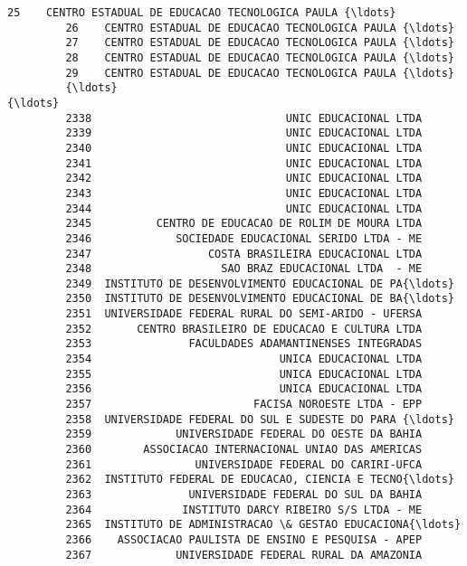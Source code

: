 \documentclass[11pt]{article}
\begin{document}
\begin{Verbatim}[commandchars=\\\{\}]
         25    CENTRO ESTADUAL DE EDUCACAO TECNOLOGICA PAULA {\ldots}   
         26    CENTRO ESTADUAL DE EDUCACAO TECNOLOGICA PAULA {\ldots}   
         27    CENTRO ESTADUAL DE EDUCACAO TECNOLOGICA PAULA {\ldots}   
         28    CENTRO ESTADUAL DE EDUCACAO TECNOLOGICA PAULA {\ldots}   
         29    CENTRO ESTADUAL DE EDUCACAO TECNOLOGICA PAULA {\ldots}   
         {\ldots}                                                 {\ldots}   
         2338                              UNIC EDUCACIONAL LTDA   
         2339                              UNIC EDUCACIONAL LTDA   
         2340                              UNIC EDUCACIONAL LTDA   
         2341                              UNIC EDUCACIONAL LTDA   
         2342                              UNIC EDUCACIONAL LTDA   
         2343                              UNIC EDUCACIONAL LTDA   
         2344                              UNIC EDUCACIONAL LTDA   
         2345          CENTRO DE EDUCACAO DE ROLIM DE MOURA LTDA   
         2346             SOCIEDADE EDUCACIONAL SERIDO LTDA - ME   
         2347                  COSTA BRASILEIRA EDUCACIONAL LTDA   
         2348                    SAO BRAZ EDUCACIONAL LTDA  - ME   
         2349  INSTITUTO DE DESENVOLVIMENTO EDUCACIONAL DE PA{\ldots}   
         2350  INSTITUTO DE DESENVOLVIMENTO EDUCACIONAL DE BA{\ldots}   
         2351  UNIVERSIDADE FEDERAL RURAL DO SEMI-ARIDO - UFERSA   
         2352       CENTRO BRASILEIRO DE EDUCACAO E CULTURA LTDA   
         2353               FACULDADES ADAMANTINENSES INTEGRADAS   
         2354                             UNICA EDUCACIONAL LTDA   
         2355                             UNICA EDUCACIONAL LTDA   
         2356                             UNICA EDUCACIONAL LTDA   
         2357                         FACISA NOROESTE LTDA - EPP   
         2358  UNIVERSIDADE FEDERAL DO SUL E SUDESTE DO PARA {\ldots}   
         2359             UNIVERSIDADE FEDERAL DO OESTE DA BAHIA   
         2360        ASSOCIACAO INTERNACIONAL UNIAO DAS AMERICAS   
         2361                UNIVERSIDADE FEDERAL DO CARIRI-UFCA   
         2362  INSTITUTO FEDERAL DE EDUCACAO, CIENCIA E TECNO{\ldots}   
         2363               UNIVERSIDADE FEDERAL DO SUL DA BAHIA   
         2364              INSTITUTO DARCY RIBEIRO S/S LTDA - ME   
         2365  INSTITUTO DE ADMINISTRACAO \& GESTAO EDUCACIONA{\ldots}   
         2366    ASSOCIACAO PAULISTA DE ENSINO E PESQUISA - APEP   
         2367             UNIVERSIDADE FEDERAL RURAL DA AMAZONIA   
         

\end{Verbatim}
\end{document}
